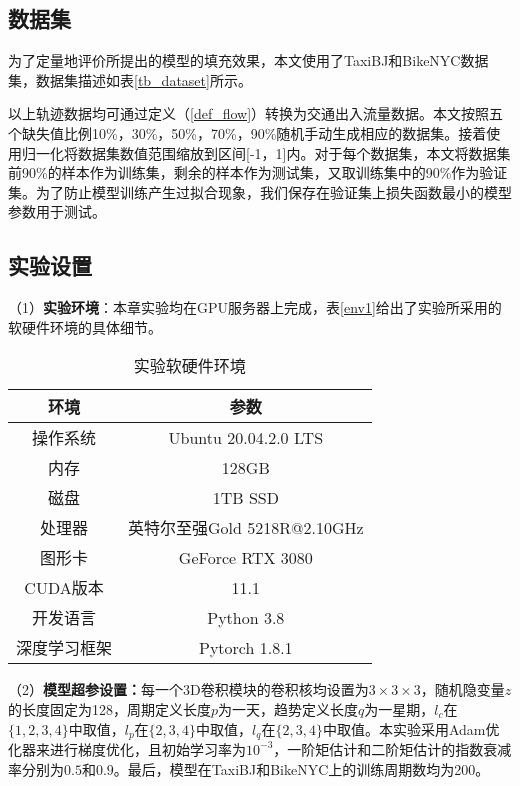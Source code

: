 \subsection{数据集}
为了定量地评价所提出的模型的填充效果，本文使用了TaxiBJ\cite{zhang2017deep}和BikeNYC\cite{zhang2017deep}数据集，数据集描述如表\ref{tb_dataset}所示。

以上轨迹数据均可通过定义（\ref{def_flow}）转换为交通出入流量数据。本文按照五个缺失值比例10\%，30\%，50\%，70\%，90\%随机手动生成相应的数据集。接着使用归一化将数据集数值范围缩放到区间[-1，1]内。对于每个数据集，本文将数据集前90\%的样本作为训练集，剩余的样本作为测试集，又取训练集中的90\%作为验证集。为了防止模型训练产生过拟合现象，我们保存在验证集上损失函数最小的模型参数用于测试。

\subsection{实验设置} \label{setup}
（1）\textbf{实验环境}：本章实验均在GPU服务器上完成，表\ref{env1}给出了实验所采用的软硬件环境的具体细节。

\begin{table}[htbp] \footnotesize
\caption{ 实验软硬件环境} \label{env2}
\vspace{0.5em}\centering\wuhao
\begin{tabular}{cc}
\toprule[1.5pt]
环境 & 参数\\
\midrule[1pt]
操作系统 & Ubuntu 20.04.2.0 LTS \\
内存 & 128GB \\
磁盘 & 1TB SSD \\
处理器 & 英特尔至强Gold 5218R@2.10GHz \\
图形卡 & GeForce RTX 3080 \\
CUDA版本 & 11.1 \\
开发语言 & Python 3.8 \\
深度学习框架 & Pytorch 1.8.1 \\
\bottomrule[1.5pt]
\end{tabular}
\end{table}

（2）\textbf{模型超参设置：}每一个3D卷积模块的卷积核均设置为$3\times 3 \times3$，随机隐变量$z$的长度固定为128，周期定义长度$p$为一天，趋势定义长度$q$为一星期，$l_c$在$\{1, 2, 3, 4\}$中取值，$l_p$在$\{2, 3, 4\}$中取值，$l_q$在$\{2, 3, 4\}$中取值。本实验采用Adam优化器来进行梯度优化，且初始学习率为$10^{-3}$，一阶矩估计和二阶矩估计的指数衰减率分别为$0.5$和$0.9$。最后，模型在TaxiBJ和BikeNYC上的训练周期数均为200。

